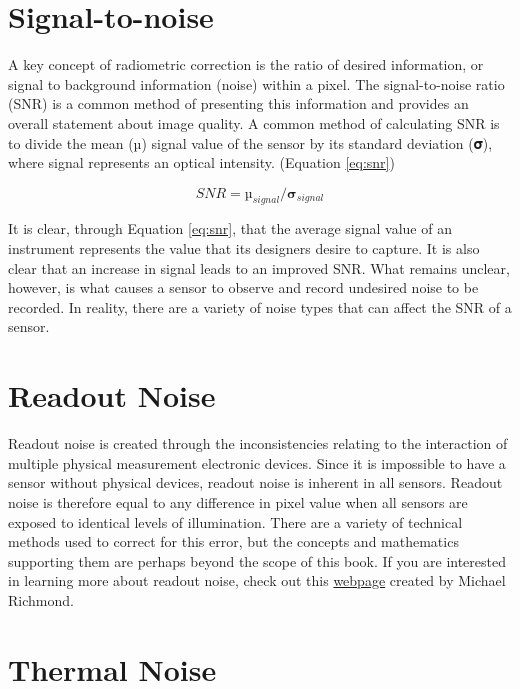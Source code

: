 \documentclass[
]{book}
\begin{document}
\hypertarget{signal-to-noise}{%
\section{Signal-to-noise}\label{signal-to-noise}}

A key concept of radiometric correction is the ratio of desired
information, or signal to background information (noise) within a pixel.
The signal-to-noise ratio (SNR) is a common method of presenting this
information and provides an overall statement about image quality. A
common method of calculating SNR is to divide the mean (µ) signal value
of the sensor by its standard deviation (𝛔), where signal represents an
optical intensity. (Equation \eqref{eq:snr})

\begin{equation}
SNR = µ _{signal} /𝛔 _{signal}
\label{eq:snr}
\end{equation}

It is clear, through Equation \eqref{eq:snr}, that the average signal
value of an instrument represents the value that its designers desire to
capture. It is also clear that an increase in signal leads to an
improved SNR. What remains unclear, however, is what causes a sensor to
observe and record undesired noise to be recorded. In reality, there are
a variety of noise types that can affect the SNR of a sensor.

\hypertarget{readout-noise}{%
\section{Readout Noise}\label{readout-noise}}

Readout noise is created through the inconsistencies relating to the
interaction of multiple physical measurement electronic devices. Since
it is impossible to have a sensor without physical devices, readout
noise is inherent in all sensors. Readout noise is therefore equal to
any difference in pixel value when all sensors are exposed to identical
levels of illumination. There are a variety of technical methods used to
correct for this error, but the concepts and mathematics supporting them
are perhaps beyond the scope of this book. If you are interested in
learning more about readout noise, check out this
\href{http://spiff.rit.edu/classes/phys445/lectures/readout/readout.html}{webpage}
created by Michael Richmond.

\hypertarget{thermal-noise}{%
\section{Thermal Noise}\label{thermal-noise}}
\end{document}
